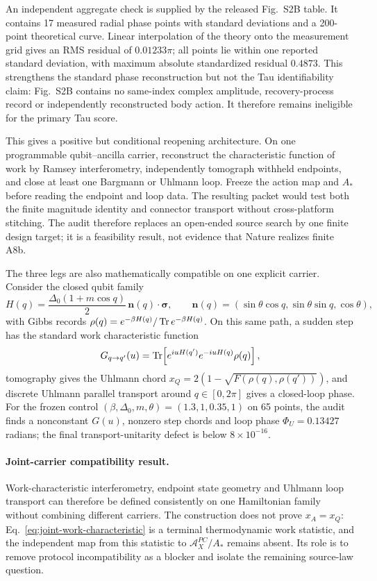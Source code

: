 An independent aggregate check is supplied by the released Fig.~S2B table.
It contains 17 measured radial phase points with standard deviations and a
200-point theoretical curve. Linear interpolation of the theory onto the
measurement grid gives an RMS residual of $0.01233\pi$; all points lie within
one reported standard deviation, with maximum absolute standardized residual
$0.4873$. This strengthens the standard phase reconstruction but not the Tau
identifiability claim: Fig.~S2B contains no same-index complex amplitude,
recovery-process record or independently reconstructed body action. It
therefore remains ineligible for the primary Tau score.

This gives a positive but conditional reopening architecture. On one
programmable qubit--ancilla carrier, reconstruct the characteristic function
of work by Ramsey interferometry, independently tomograph withheld endpoints,
and close at least one Bargmann or Uhlmann loop. Freeze the action map and
$A_*$ before reading the endpoint and loop data. The resulting packet would
test both the finite magnitude identity and connector transport without
cross-platform stitching. The audit therefore replaces an open-ended source
search by one finite design target; it is a feasibility result, not evidence
that Nature realizes finite A8b.

The three legs are also mathematically compatible on one explicit carrier.
Consider the closed qubit family
\begin{equation}
 H(q)=\frac{\Delta_0(1+m\cos q)}{2}\,
 \mathbf n(q)\!\cdot\!\boldsymbol\sigma,
 \qquad
 \mathbf n(q)=(\sin\theta\cos q,\sin\theta\sin q,\cos\theta),
 \label{eq:joint-qubit-source}
\end{equation}
with Gibbs records
$\rho(q)=e^{-\beta H(q)}/\operatorname{Tr} e^{-\beta H(q)}$.  On this same path, a sudden
step has the standard work characteristic function
\begin{equation}
 G_{q\to q'}(u)=
 \operatorname{Tr}\!\left[e^{iuH(q')}e^{-iuH(q)}\rho(q)\right],
 \label{eq:joint-work-characteristic}
\end{equation}
tomography gives the Uhlmann chord
$x_Q=2(1-\sqrt{F(\rho(q),\rho(q'))})$, and discrete Uhlmann parallel transport
around $q\in[0,2\pi]$ gives a closed-loop phase.  For the frozen control
$(\beta,\Delta_0,m,\theta)=(1.3,1,0.35,1)$ on 65 points, the audit finds a
nonconstant $G(u)$, nonzero step chords and loop phase
$\Phi_U=0.13427$ radians; the final transport-unitarity defect is below
$8\times10^{-16}$.

\paragraph{Joint-carrier compatibility result.}
Work-characteristic interferometry, endpoint state geometry and Uhlmann loop
transport can therefore be defined consistently on one Hamiltonian family
without combining different carriers.  The construction does not prove
$x_A=x_Q$: Eq.~\eqref{eq:joint-work-characteristic} is a terminal
thermodynamic work statistic, and the independent map from this statistic to
$\mathcal A_X^{PC}/A_*$ remains absent.  Its role is to remove protocol
incompatibility as a blocker and isolate the remaining source-law question.

